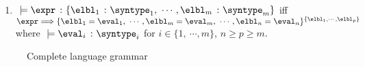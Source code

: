 \begin{definition}
  \label{def_typingRec}
  \ \par
  \begin{enumerate}
      \item $\ \models \hastype{\expr}{\{\hastype{\elbl_1}{\syntype_1},\ \cdots, \hastype{\elbl_m}{\syntype_m}\}}$ iff $\expr \bigstep \{\elbl_1 = \eval_1,\ \cdots, \elbl_m = \eval_m,\ \cdots, \elbl_n = \eval_n\}^{\{\elbl_1, \cdots, \elbl_p\}}$ where $\ \models \hastype{\eval_i}{\syntype_i}$ for $i \in \{1,\ \cdots, m\}$, $n \geq p \geq m$.
  \end{enumerate}
\end{definition}

\begin{figure}[hbt!]%
  \begin{grammar}
            \grule[types]{\syntype}{
                \tint
                \gor \tbool
                \gor \tfun
                \gor \tpoly
                \gor \mkunion{\syntype}{\syntype}
                \gor \mkintersect{\syntype}{\syntype}
                \gor \mktset{\syntype}{\expr}
                \gor \mkdfun{\ev}{\syntype}{\syntype}
                \gor \mkmiu{\alpha}{\syntype}
                \gor \{\overline{\hastype{\elbl}{\syntype}}\}
          }
        \end{grammar}
    \caption{Complete language grammar}
    \label{fig_completeGrammar}
\end{figure}

